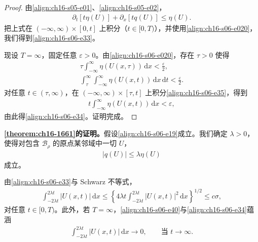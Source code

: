 \documentclass[../../main.tex]{subfiles}
\begin{document}
\begin{proof}
由\eqref{align:ch16-s05-e01}、\eqref{align:ch16-s05-e02}，
\begin{align}
\partial_t[t\eta(U)]+\partial_x[tq(U)]\leqslant\eta(U).
\label{align:ch16-s06-e35}
\end{align}
把上式在 $(-\infty,\infty)\times[0,t]$ 上积分（$t\in[0,T)$），并使用\eqref{align:ch16-s06-e020}，我们得到\eqref{align:ch16-s06-e33}。

现设 $T=\infty$，固定任意 $\varepsilon>0$。由\eqref{align:ch16-s06-e020}，存在 $\tau>0$ 使得
\begin{align}
\tau\int_{-\infty}^{\infty}\eta(U(x,\tau))\,\mathrm{d}x<\frac{\varepsilon}{2},
\label{align:ch16-s06-e36}\\
\int_\tau^\infty\int_{-\infty}^{\infty}\eta(U(x,t))\,\mathrm{d}x\,\mathrm{d}t<\frac{\varepsilon}{2}.
\label{align:ch16-s06-e37}
\end{align}
对任意 $t\in(\tau,\infty)$，在 $(-\infty,\infty)\times[\tau,t]$ 上积分\eqref{align:ch16-s06-e35}，得到
\begin{align}
t\int_{-\infty}^{\infty}\eta(U(x,t))\,\mathrm{d}x<\varepsilon,
\label{align:ch16-s06-e38}
\end{align}
由此得\eqref{align:ch16-s06-e34}。证明完成。
\end{proof}

\textbf{\cref{theorem:ch16-1661}的证明。}假设\eqref{align:ch16-s06-e19}成立。我们确定 $\lambda>0$，使得对包含 $\mathscr{B}_\rho$ 的原点某邻域中一切 $U$，
\begin{align}
|q(U)|\leqslant\lambda\eta(U)
\label{align:ch16-s06-e39}
\end{align}
成立。

由\eqref{align:ch16-s06-e33}与 Schwarz 不等式，
\begin{align}
\int_{-2\lambda t}^{2\lambda t}|U(x,t)|\,\mathrm{d}x\leqslant\left\{4\lambda t\int_{-2\lambda t}^{2\lambda t}|U(x,t)|^2\,\mathrm{d}x\right\}^{1/2}\leqslant c\sigma,
\label{align:ch16-s06-e40}
\end{align}
对任意 $t\in[0,T)$。此外，若 $T=\infty$，\eqref{align:ch16-s06-e40}与\eqref{align:ch16-s06-e34}蕴涵
\begin{align}
\int_{-2\lambda t}^{2\lambda t}|U(x,t)|\,\mathrm{d}x\to0,\qquad\text{当 }t\to\infty.
\label{align:ch16-s06-e41}
\end{align}
\end{document}
